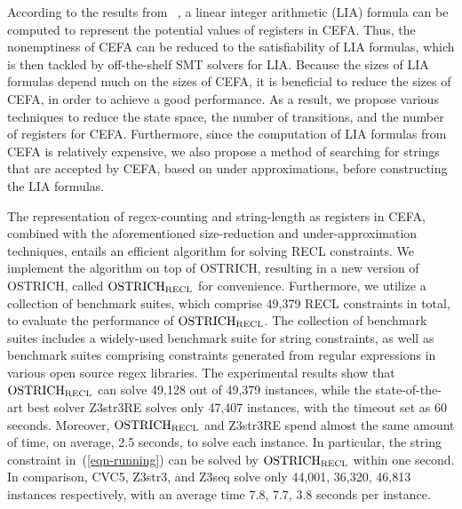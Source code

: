 According to the results from~ \cite{atva2020}, a linear integer arithmetic (LIA) formula can be computed to represent the potential values of registers in CEFA. Thus, the nonemptiness of CEFA can be reduced to the satisfiability of LIA formulas, which is then tackled by off-the-shelf SMT solvers for LIA. 
%
Because the sizes of LIA formulas depend much on the sizes of CEFA, it is beneficial to reduce the sizes of CEFA, in order to achieve a good performance. As a result, we propose various techniques to reduce the state space, the number of transitions, and the number of registers for CEFA. Furthermore, since the computation of LIA formulas from CEFA is relatively expensive, we also propose a method of searching for strings that are accepted by CEFA, based on under approximations, before constructing the LIA formulas.  

The representation of regex-counting and string-length as registers in CEFA, combined with the aforementioned size-reduction and under-approximation techniques, entails an efficient algorithm for solving RECL constraints. We implement the algorithm on top of OSTRICH, resulting in a new version of OSTRICH, called $\rm OSTRICH_{RECL}$ for convenience. 
%
Furthermore, we utilize a collection of benchmark suites, which comprise 49,379 RECL constraints in total, to evaluate the performance of $\rm OSTRICH_{RECL}$. The collection of benchmark suites includes a widely-used benchmark suite for string constraints, as well as benchmark suites comprising constraints generated from regular expressions in various open source regex libraries. 
%
%
The experimental results show that $\rm OSTRICH_{RECL}$ can solve 49,128 out of 49,379 instances, while the state-of-the-art best solver Z3str3RE solves only 47,407 instances, with the timeout set as 60 seconds. Moreover, $\rm OSTRICH_{RECL}$ and Z3str3RE spend almost the same amount of time, on average, 2.5 seconds, to solve each instance. 
In particular, the string constraint in~(\ref{eqn-running}) can be solved by $\rm OSTRICH_{RECL}$ within one second. 
In comparison, CVC5, Z3str3, and Z3seq solve only 44,001, 36,320, 46,813 instances respectively, with an average time 7.8, 7.7, 3.8 seconds per instance. 

